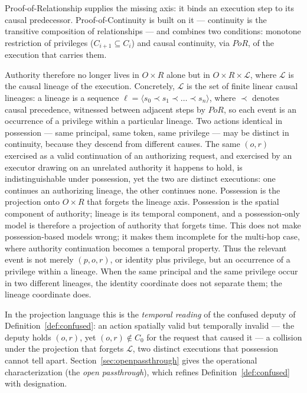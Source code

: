 \documentclass[11pt]{article}
\begin{document}
Proof-of-Relationship supplies the missing axis: it binds an execution step to
its causal predecessor. Proof-of-Continuity is built on it --- continuity is the
transitive composition of relationships --- and combines two conditions: monotone
restriction of privileges ($C_{i+1} \subseteq C_i$) and causal continuity, via
$PoR$, of the execution that carries them.

Authority therefore no longer lives in $O \times R$ alone but in
$O \times R \times \mathcal{L}$, where $\mathcal{L}$ is the causal lineage of the
execution. Concretely, $\mathcal{L}$ is the set of finite linear causal
lineages: a lineage is a sequence
$\ell = \langle s_0 \prec s_1 \prec \dots \prec s_n \rangle$, where $\prec$
denotes causal precedence, witnessed between adjacent steps by $PoR$, so each
event is an occurrence of a privilege within a particular lineage. Two actions identical in possession --- same principal, same token,
same privilege --- may be distinct in continuity, because they descend from
different causes. The same $(o,r)$ exercised as a valid continuation of an
authorizing request, and exercised by an executor drawing on an unrelated
authority it happens to hold, is indistinguishable under possession, yet the two
are distinct executions: one continues an authorizing lineage, the other
continues none.
Possession is the projection onto $O \times R$ that forgets the lineage axis.
Possession is the spatial component of authority; lineage is its temporal
component, and a possession-only model is therefore a projection of authority
that forgets time. This does not make possession-based models wrong; it makes
them incomplete for the multi-hop case, where authority continuation becomes a
temporal property. Thus the relevant event is not merely $(p,o,r)$, or identity
plus privilege, but an occurrence of a privilege within a lineage. When the same
principal and the same privilege occur in two different lineages, the identity
coordinate does not separate them; the lineage coordinate does.

In the projection language this is the \emph{temporal reading} of the confused
deputy of Definition~\ref{def:confused}: an action spatially valid but temporally invalid --- the
deputy holds $(o,r)$, yet $(o,r) \notin C_0$ for the request that caused it ---
a collision under the projection that forgets $\mathcal{L}$, two distinct
executions that possession cannot tell apart. Section~\ref{sec:openpassthrough}
gives the operational characterization (the \emph{open passthrough}), which
refines Definition~\ref{def:confused} with designation.
\end{document}
